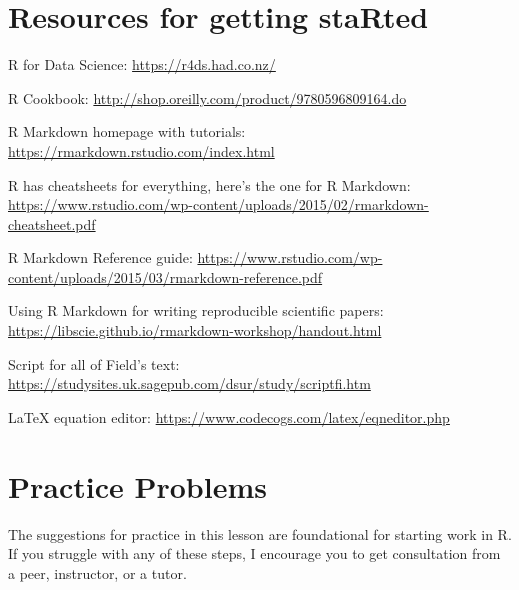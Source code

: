 \documentclass[
  11pt,
]{book}
\begin{document}
\hypertarget{resources-for-getting-started}{%
\section{Resources for getting staRted}\label{resources-for-getting-started}}

R for Data Science: \url{https://r4ds.had.co.nz/}

R Cookbook: \url{http://shop.oreilly.com/product/9780596809164.do}

R Markdown homepage with tutorials: \url{https://rmarkdown.rstudio.com/index.html}

R has cheatsheets for everything, here's the one for R Markdown: \url{https://www.rstudio.com/wp-content/uploads/2015/02/rmarkdown-cheatsheet.pdf}

R Markdown Reference guide: \url{https://www.rstudio.com/wp-content/uploads/2015/03/rmarkdown-reference.pdf}

Using R Markdown for writing reproducible scientific papers: \url{https://libscie.github.io/rmarkdown-workshop/handout.html}

Script for all of Field's text: \url{https://studysites.uk.sagepub.com/dsur/study/scriptfi.htm}

LaTeX equation editor: \url{https://www.codecogs.com/latex/eqneditor.php}

\hypertarget{practice-problems}{%
\section{Practice Problems}\label{practice-problems}}

The suggestions for practice in this lesson are foundational for starting work in R. If you struggle with any of these steps, I encourage you to get consultation from a peer, instructor, or a tutor.
\end{document}
